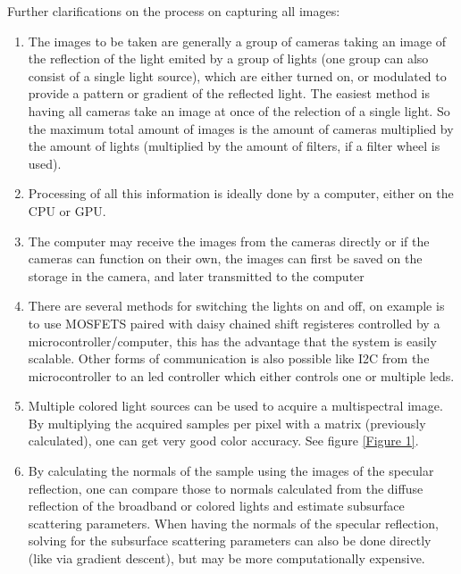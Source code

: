 \documentclass[11pt, twoside, listof=totocnumbered, bibliography=totocnumbered]{scrartcl}
\newcommand{\br}{\hfill\\}
\begin{document}
Further clarifications on the process on capturing all images:
\begin{enumerate}
	\item The images to be taken are generally a group of cameras taking an image of the reflection of the light emited by a group of lights (one group can also consist of a single light source), which are either turned on, or modulated to provide a pattern or gradient of the reflected light. The easiest method is having all cameras take an image at once of the relection of a single light. So the maximum total amount of images is the amount of cameras multiplied by the amount of lights (multiplied by the amount of filters, if a filter wheel is used).
	\item Processing of all this information is ideally done by a computer, either on the CPU or GPU.
	\item The computer may receive the images from the cameras directly or if the cameras can function on their own, the images can first be saved on the storage in the camera, and later transmitted to the computer
	\item There are several methods for switching the lights on and off, on example is to use MOSFETS paired with daisy chained shift registeres controlled by a microcontroller/computer, this has the advantage that the system is easily scalable. Other forms of communication is also possible like I2C from the microcontroller to an led controller which either controls one or multiple leds.
	\item Multiple colored light sources can be used to acquire a multispectral image. By multiplying the acquired samples per pixel with a matrix (previously calculated), one can get very good color accuracy. See figure \ref{Figure 1}.
	\item By calculating the normals of the sample using the images of the specular reflection, one can compare those to normals calculated from the diffuse reflection of the broadband or colored lights and estimate subsurface scattering parameters. When having the normals of the specular reflection, solving for the subsurface scattering parameters can also be done directly (like via gradient descent), but may be more computationally expensive. \cite{SSS}
\end{enumerate}\br
\end{document}
